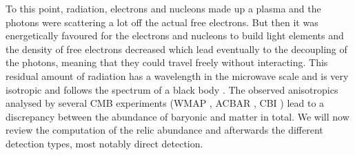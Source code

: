 To this point, radiation, electrons and nucleons made up a plasma and the photons were scattering a lot off the actual free electrons. But then it was 
energetically favoured for the electrons and nucleons to build light elements and the density of free electrons decreased which lead eventually to the decoupling
of the photons, meaning that they could travel freely without interacting. This residual amount of radiation has a wavelength in the microwave scale 
and is very isotropic and follows the spectrum of a black body \cite{DM-EvCaDo}. The observed anisotropics analysed by several CMB experiments 
(WMAP \cite{1212.5226}, ACBAR \cite{0303515}, CBI \cite{0205388}) lead to a discrepancy
between the abundance of baryonic and matter in total. We will now review the computation of the relic abundance and afterwards the different 
detection types, most notably direct detection.
